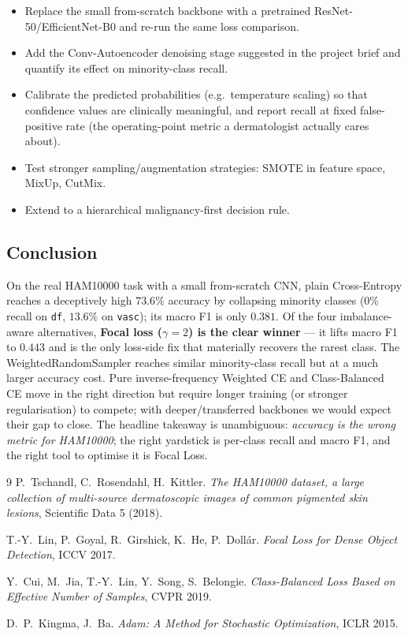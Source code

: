 \documentclass[11pt,a4paper]{article}
\theoremstyle{definition}
\begin{document}
\begin{itemize}[leftmargin=1.2em,itemsep=2pt]
    \item Replace the small from-scratch backbone with a pretrained
          ResNet-50/EfficientNet-B0 and re-run the same loss comparison.
    \item Add the Conv-Autoencoder denoising stage suggested in the project
          brief and quantify its effect on minority-class recall.
    \item Calibrate the predicted probabilities (e.g.\ temperature scaling)
          so that confidence values are clinically meaningful, and report
          recall at fixed false-positive rate (the operating-point metric a
          dermatologist actually cares about).
    \item Test stronger sampling/augmentation strategies: SMOTE in feature
          space, MixUp, CutMix.
    \item Extend to a hierarchical malignancy-first decision rule.
\end{itemize}

\subsection{Conclusion}

\begin{answerbox}
On the real HAM10000 task with a small from-scratch CNN, plain Cross-Entropy
reaches a deceptively high $73.6\%$ accuracy by collapsing minority classes
($0\%$ recall on \texttt{df}, $13.6\%$ on \texttt{vasc}); its macro F1 is
only $0.381$. Of the four imbalance-aware alternatives, \textbf{Focal loss
($\gamma{=}2$) is the clear winner} --- it lifts macro F1 to $0.443$ and is
the only loss-side fix that materially recovers the rarest class. The
WeightedRandomSampler reaches similar minority-class recall but at a much
larger accuracy cost. Pure inverse-frequency Weighted CE and Class-Balanced
CE move in the right direction but require longer training (or stronger
regularisation) to compete; with deeper/transferred backbones we would expect
their gap to close. The headline takeaway is unambiguous: \emph{accuracy is
the wrong metric for HAM10000}; the right yardstick is per-class recall and
macro F1, and the right tool to optimise it is Focal Loss.
\end{answerbox}

\bigskip

\begin{thebibliography}{9}
P.~Tschandl, C.~Rosendahl, H.~Kittler.
\textit{The HAM10000 dataset, a large collection of multi-source dermatoscopic
images of common pigmented skin lesions}, Scientific Data 5 (2018).

T.-Y.~Lin, P.~Goyal, R.~Girshick, K.~He, P.~Doll{\'a}r.
\textit{Focal Loss for Dense Object Detection}, ICCV 2017.

Y.~Cui, M.~Jia, T.-Y.~Lin, Y.~Song, S.~Belongie.
\textit{Class-Balanced Loss Based on Effective Number of Samples}, CVPR 2019.

D.~P.~Kingma, J.~Ba.
\textit{Adam: A Method for Stochastic Optimization}, ICLR 2015.
\end{thebibliography}
\end{document}
